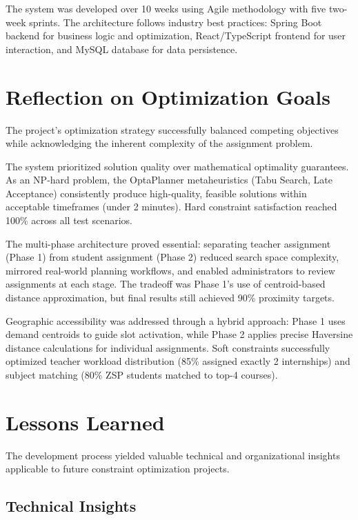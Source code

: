 \documentclass[12pt,a4paper]{report}
\begin{document}
The system was developed over 10 weeks using Agile methodology with five two-week sprints. The architecture follows industry best practices: Spring Boot backend for business logic and optimization, React/TypeScript frontend for user interaction, and MySQL database for data persistence.

\section{Reflection on Optimization Goals}

The project's optimization strategy successfully balanced competing objectives while acknowledging the inherent complexity of the assignment problem.

The system prioritized solution quality over mathematical optimality guarantees. As an NP-hard problem, the OptaPlanner metaheuristics (Tabu Search, Late Acceptance) consistently produce high-quality, feasible solutions within acceptable timeframes (under 2 minutes). Hard constraint satisfaction reached 100\% across all test scenarios.

The multi-phase architecture proved essential: separating teacher assignment (Phase 1) from student assignment (Phase 2) reduced search space complexity, mirrored real-world planning workflows, and enabled administrators to review assignments at each stage. The tradeoff was Phase 1's use of centroid-based distance approximation, but final results still achieved 90\% proximity targets.

Geographic accessibility was addressed through a hybrid approach: Phase 1 uses demand centroids to guide slot activation, while Phase 2 applies precise Haversine distance calculations for individual assignments. Soft constraints successfully optimized teacher workload distribution (85\% assigned exactly 2 internships) and subject matching (80\% ZSP students matched to top-4 courses).

\section{Lessons Learned}

The development process yielded valuable technical and organizational insights applicable to future constraint optimization projects.

\subsection{Technical Insights}
\end{document}
